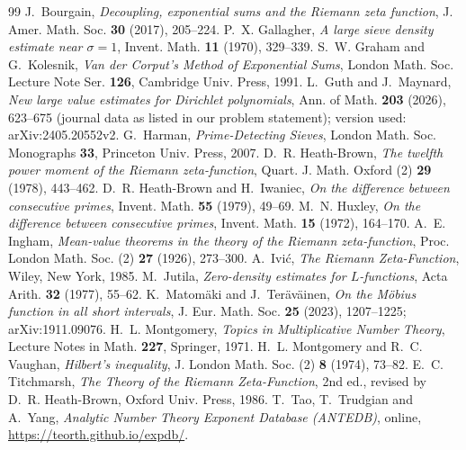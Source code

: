 \documentclass[11pt]{amsart}
\theoremstyle{definition}
\theoremstyle{remark}
\begin{document}
{\small
\begin{thebibliography}{99}
 J.~Bourgain, \emph{Decoupling, exponential sums and the Riemann zeta function}, J. Amer. Math. Soc. \textbf{30} (2017), 205--224.
 P.~X. Gallagher, \emph{A large sieve density estimate near $\sigma=1$}, Invent. Math. \textbf{11} (1970), 329--339.
 S.~W. Graham and G.~Kolesnik, \emph{Van der Corput's Method of Exponential Sums}, London Math. Soc. Lecture Note
Ser. \textbf{126}, Cambridge Univ. Press, 1991.
 L.~Guth and J.~Maynard, \emph{New large value estimates for Dirichlet polynomials}, Ann. of Math. \textbf{203}
(2026), 623--675 (journal data as listed in our problem statement); version used: arXiv:2405.20552v2.
 G.~Harman, \emph{Prime-Detecting Sieves}, London Math. Soc. Monographs \textbf{33}, Princeton Univ. Press, 2007.
 D.~R. Heath-Brown, \emph{The twelfth power moment of the Riemann zeta-function}, Quart. J. Math. Oxford (2) \textbf{29} (1978), 443--462.
 D.~R. Heath-Brown and H.~Iwaniec, \emph{On the difference between consecutive primes}, Invent. Math.
\textbf{55} (1979), 49--69.
 M.~N. Huxley, \emph{On the difference between consecutive primes}, Invent. Math. \textbf{15} (1972), 164--170.
 A.~E. Ingham, \emph{Mean-value theorems in the theory of the Riemann zeta-function}, Proc. London Math. Soc. (2)
\textbf{27} (1926), 273--300.
 A.~Ivi\'c, \emph{The Riemann Zeta-Function}, Wiley, New York, 1985.
 M.~Jutila, \emph{Zero-density estimates for $L$-functions}, Acta Arith. \textbf{32} (1977), 55--62.
 K.~Matom\"aki and J.~Ter\"av\"ainen, \emph{On the M\"obius function in all short intervals}, J. Eur. Math. Soc.
\textbf{25} (2023), 1207--1225; arXiv:1911.09076.
 H.~L. Montgomery, \emph{Topics in Multiplicative Number Theory}, Lecture Notes in Math. \textbf{227}, Springer, 1971.
 H.~L. Montgomery and R.~C. Vaughan, \emph{Hilbert's inequality}, J. London Math. Soc. (2) \textbf{8} (1974), 73--82.
 E.~C. Titchmarsh, \emph{The Theory of the Riemann Zeta-Function}, 2nd ed., revised by D.~R. Heath-Brown, Oxford
Univ. Press, 1986.
 T.~Tao, T.~Trudgian and A.~Yang, \emph{Analytic Number Theory Exponent Database (ANTEDB)}, online,
\url{https://teorth.github.io/expdb/}.
\end{thebibliography}
}
\end{document}
